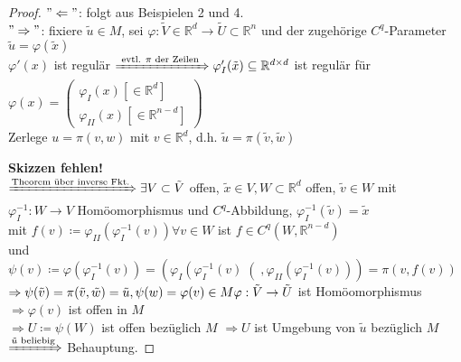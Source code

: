 \begin{proof}

$"\Leftarrow"$: folgt aus Beispielen 2 und 4. \\
$"\Rightarrow"$: fixiere $\tilde{u} \in M $, sei $\varphi : \tilde{V} \in \mathbb{R}^d
\rightarrow \tilde{U} \subset \mathbb{R}^n $ und der zugehörige $C^q$-Parameter 
$\tilde{u} = \varphi (\tilde{x})$ \\
$\varphi' (x)$ ist regulär $\xRightarrow{\text{ evtl. $\pi$ der Zeilen }} \varphi_I ' 
(\tilde{x}) \subseteq \mathbb{R}^{d \times d} $ ist regulär für $\varphi (x) =
    \begin{pmatrix}
    \varphi_I (x) \left[ \in \mathbb{R}^d \right]\\
    \varphi_{II} (x) \left[ \in \mathbb{R}^{n-d} \right]
    \end{pmatrix}
$ \\
Zerlege $u = \pi (v,w) $ mit $v \in \mathbb{R}^d $, 
d.h. $\tilde{u} = \pi (\tilde{v},\tilde{w})$

\textbf{Skizzen fehlen!}\\
$\xRightarrow{\text{Theorem über inverse Fkt.}} \exists V \subset \tilde{V} $ offen,
$\tilde{x} \in V, W \subset \mathbb{R}^d $ offen, $\tilde{v} \in W $
mit $\varphi_I ^{-1} : W \rightarrow V $ Homöomorphismus und $C^q$-Abbildung,
$\varphi_I ^{-1} (\tilde{v}) = \tilde{x} $ \\
mit $f(v) \coloneqq \varphi_{II} \left(\varphi_I ^{-1} (v)\right) \forall v \in W $ ist 
$f \in C^q \left(W, \mathbb{R}^{n-d}\right) $ \\
und $\psi (v) \coloneqq \varphi \left(\varphi_I ^{-1} (v) \right) =
\left( \varphi_I \left(\varphi_I ^{-1} (v) \right( ,
\varphi_{II} \left(\varphi_I ^ {-1} (v) \right) \right) = \pi \left(v, f(v)\right) $ \\
$\Rightarrow \psi (\tilde{v}) = \pi (\tilde{v}, \tilde{w}) = \tilde{u},
\psi (w) = \varphi (v) \in M \\
\varphi : \tilde{V} \rightarrow \tilde{U} $ ist Homöomorphismus \\
$\Rightarrow \varphi (v) $ ist offen in $M$ \\
$ \Rightarrow U \coloneqq \psi (W) $ ist offen bezüglich $M$
$\Rightarrow U $ ist Umgebung von $\tilde{u} $ bezüglich $M$ \\
$\xRightarrow{\tilde{u} \text{ beliebig}} $ Behauptung. 

\end{proof}

